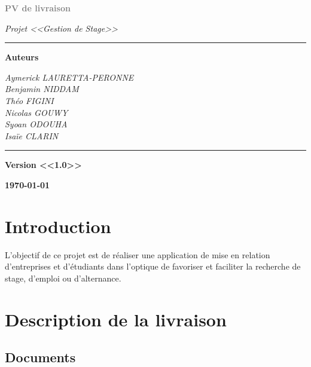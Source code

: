 \documentclass[a4paper, 12pt]{report}
\begin{document}
\begin{titlepage}
    \begin{center}
        \vspace*{\fill}


        \textcolor{gray}{\textbf{\huge{PV de livraison}}}

        \vspace{0.5cm}

        \textsl{\large{Projet <<Gestion de Stage>>}}

        \vspace{1.5cm}

        \rule{\linewidth}{0.15mm}
        \textbf{Auteurs}

        \vspace{0.5cm}

        \small{\textit{Aymerick LAURETTA-PERONNE}} \\
        \small{\textit{Benjamin NIDDAM}} \\
        \small{\textit{Théo FIGINI}} \\
        \small{\textit{Nicolas GOUWY}} \\
        \small{\textit{Syoan ODOUHA}} \\
        \small{\textit{Isaïe CLARIN}}
        \rule{\linewidth}{0.15mm}

        \vspace{2.5cm}

        \textbf{Version <<1.0>>}

        \vfill
        \textbf{\today {}}
    \end{center}
    \vspace*{\fill}
\end{titlepage}

\section*{Introduction}

L'objectif de ce projet est de réaliser une application de mise en relation d'entreprises et d'étudiants dans l'optique de favoriser
et faciliter la recherche de stage, d'emploi ou d'alternance.

\newpage
\section*{Description de la livraison}
\subsection*{Documents}
\end{document}
